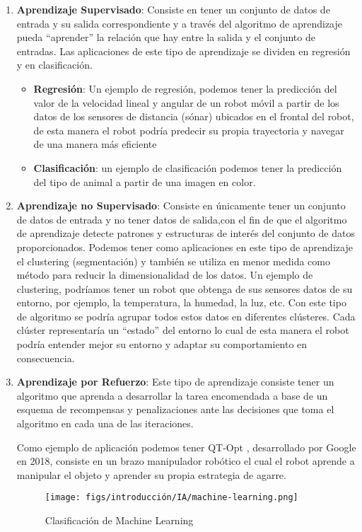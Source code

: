\begin{enumerate}
  \item \textbf{Aprendizaje Supervisado}: Consiste en tener un conjunto de datos de entrada y su salida correspondiente y a través del algoritmo de aprendizaje pueda “aprender” la
  relación que hay entre la salida y el conjunto de entradas. Las aplicaciones de este tipo
  de aprendizaje se dividen en regresión y en clasificación. 
  \begin{itemize}
    \item \textbf{Regresión}: Un ejemplo de regresión, podemos tener la predicción del valor de la velocidad lineal y angular de un robot móvil a partir de los datos de los sensores de distancia (sónar) ubicados en el frontal del robot, de esta manera el robot podría predecir su propia trayectoria y navegar de una manera más eficiente
    \item \textbf{Clasificación}: un ejemplo de clasificación podemos tener la predicción
    del tipo de animal a partir de una imagen en color.
  \end{itemize}
  \item \textbf{Aprendizaje no Supervisado}: Consiste en únicamente tener un conjunto de datos de
  entrada y no tener datos de salida,con el fin de que el algoritmo de aprendizaje
  detecte patrones y estructuras de interés del conjunto de datos proporcionados.
  Podemos tener como aplicaciones en este tipo de aprendizaje el clustering
  (segmentación) y también se utiliza en menor medida como método para reducir la
  dimensionalidad de los datos. 
  Un ejemplo de clustering, podríamos tener un robot que obtenga de sus sensores
  datos de su entorno, por ejemplo, la temperatura, la humedad, la luz, etc. Con este
  tipo de algoritmo se podría agrupar todos estos datos en diferentes clústeres. Cada
  clúster representaría un “estado” del entorno lo cual de esta manera el robot podría
  entender mejor su entorno y adaptar su comportamiento en consecuencia.
  \item \textbf{Aprendizaje por Refuerzo}: Este tipo de aprendizaje consiste tener un algoritmo que
  aprenda a desarrollar la tarea encomendada a base de un esquema de recompensas y
  penalizaciones ante las decisiones que toma el algoritmo en cada una de las
  iteraciones. \newline

  Como ejemplo de aplicación podemos tener QT-Opt \cite{QTOpt}, desarrollado por
  Google en 2018, consiste en un brazo manipulador robótico el cual el robot aprende a
  manipular el objeto y aprender su propia estrategia de agarre.

  \begin{figure} [H]
    \begin{center}
      \texttt{[image: figs/introducción/IA/machine-learning.png]}
    \end{center}
    \caption{Clasificación de Machine Learning }
    \label{fig:machinelearning}
  \end{figure}

  



\end{enumerate}



